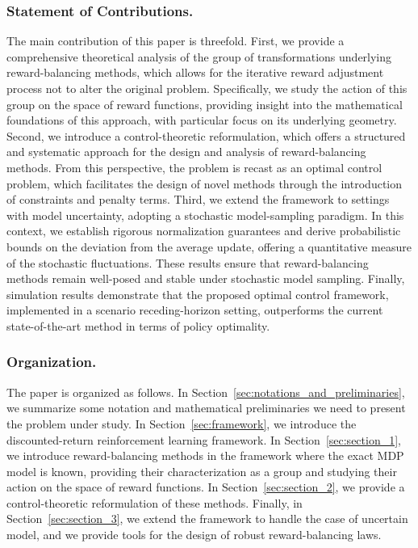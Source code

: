 \documentclass[10pt,leqno]{amsart}
\begin{document}
\subsubsection*{Statement of Contributions.} The main contribution of this paper is threefold. First, we provide a comprehensive theoretical analysis of the group of transformations underlying reward-balancing methods, which allows for the iterative reward adjustment process not to alter the original problem. Specifically, we study the action of this group on the space of reward functions, providing insight into the mathematical foundations of this approach, with particular focus on its underlying geometry. Second, we introduce a control-theoretic reformulation, which offers a structured and systematic approach for the design and analysis of reward-balancing methods. From this perspective, the problem is recast as an optimal control problem, which facilitates the design of novel methods through the introduction of constraints and penalty terms. Third, we extend the framework to settings with model uncertainty, adopting a stochastic model-sampling paradigm. In this context, we establish rigorous normalization guarantees and derive probabilistic bounds on the deviation from the average update, offering a quantitative measure of the stochastic fluctuations. These results ensure that reward-balancing methods remain well-posed and stable under stochastic model sampling. Finally, simulation results demonstrate that the proposed optimal control framework, implemented in a scenario receding-horizon setting, outperforms the current state-of-the-art method in terms of policy optimality.
\subsubsection*{Organization.}
The paper is organized as follows. In Section~\ref{sec:notations_and_preliminaries}, we summarize some notation and mathematical preliminaries we need to present the problem under study. In Section~\ref{sec:framework}, we introduce the discounted-return reinforcement learning framework. In Section~\ref{sec:section_1}, we introduce reward-balancing methods in the framework where the exact MDP model is known, providing their characterization as a group and studying their action on the space of reward functions. In Section~\ref{sec:section_2}, we provide a control-theoretic reformulation of these methods. Finally, in Section~\ref{sec:section_3}, we extend the framework to handle the case of uncertain model, and we provide tools for the design of robust reward-balancing laws.
%
\end{document}
